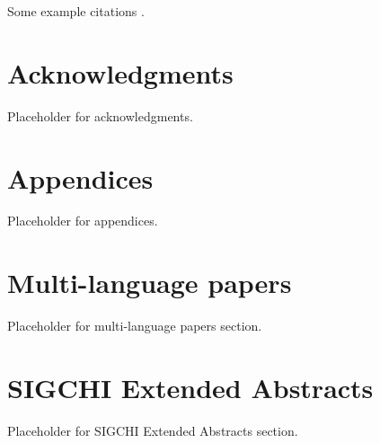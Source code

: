 Some example citations \cite{Abril07}.

\section{Acknowledgments}

Placeholder for acknowledgments.

\section{Appendices}

Placeholder for appendices.

\section{Multi-language papers}

Placeholder for multi-language papers section.

\section{SIGCHI Extended Abstracts}

Placeholder for SIGCHI Extended Abstracts section.
